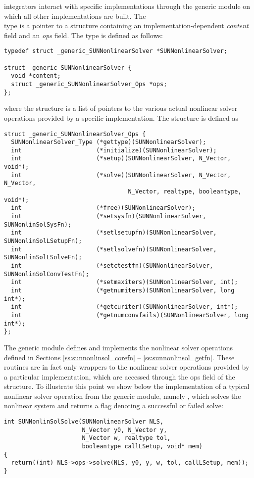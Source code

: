 {\sundials} integrators interact with specific {\sunnonlinsol}
implementations through the generic {\sunnonlinsol} module on which all
other {\sunnonlinsol} implementations are built. The \\ \noindent 
{} type is a pointer to a structure containing an
implementation-dependent \textit{content} field and an \textit{ops}
field. The type  is defined as follows:
\begin{verbatim}
typedef struct _generic_SUNNonlinearSolver *SUNNonlinearSolver;

struct _generic_SUNNonlinearSolver {
  void *content;
  struct _generic_SUNNonlinearSolver_Ops *ops;
};
\end{verbatim}
where the  structure is a list of
pointers to the various actual nonlinear solver operations provided by a
specific implementation. The 
structure is defined as
\begin{verbatim}
struct _generic_SUNNonlinearSolver_Ops {
  SUNNonlinearSolver_Type (*gettype)(SUNNonlinearSolver);
  int                     (*initialize)(SUNNonlinearSolver);
  int                     (*setup)(SUNNonlinearSolver, N_Vector, void*);
  int                     (*solve)(SUNNonlinearSolver, N_Vector, N_Vector,
                                   N_Vector, realtype, booleantype, void*);
  int                     (*free)(SUNNonlinearSolver);
  int                     (*setsysfn)(SUNNonlinearSolver, SUNNonlinSolSysFn);
  int                     (*setlsetupfn)(SUNNonlinearSolver, SUNNonlinSolLSetupFn);
  int                     (*setlsolvefn)(SUNNonlinearSolver, SUNNonlinSolLSolveFn);
  int                     (*setctestfn)(SUNNonlinearSolver, SUNNonlinSolConvTestFn);
  int                     (*setmaxiters)(SUNNonlinearSolver, int);
  int                     (*getnumiters)(SUNNonlinearSolver, long int*);
  int                     (*getcuriter)(SUNNonlinearSolver, int*);
  int                     (*getnumconvfails)(SUNNonlinearSolver, long int*);
};
\end{verbatim}
The generic {\sunnonlinsol} module defines and implements the nonlinear
solver operations defined in Sections \ref{ss:sunnonlinsol_corefn}
-- \ref{ss:sunnonlinsol_getfn}. These routines are in fact only
wrappers to the nonlinear solver operations provided by a particular
{\sunnonlinsol} implementation, which are accessed through the ops
field of the  structure. To illustrate this
point we show below the implementation of a typical nonlinear solver
operation from the generic {\sunnonlinsol} module, namely
, which solves the nonlinear system and returns a flag
denoting a successful or failed solve:
\begin{verbatim}
int SUNNonlinSolSolve(SUNNonlinearSolver NLS,
                      N_Vector y0, N_Vector y,
                      N_Vector w, realtype tol,
                      booleantype callLSetup, void* mem)
{
  return((int) NLS->ops->solve(NLS, y0, y, w, tol, callLSetup, mem));
}
\end{verbatim}


